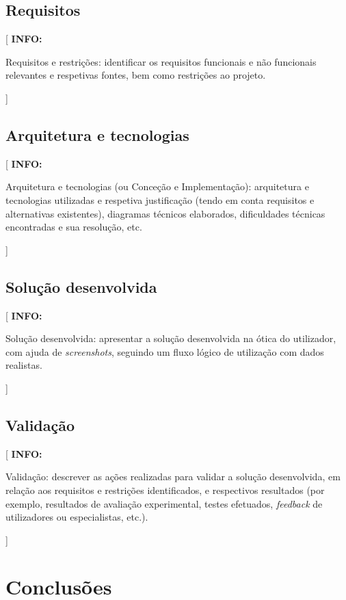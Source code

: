 \documentclass[11pt,a4paper]{report}
\newenvironment{info}[1]{\vspace*{6mm}\color{blue}[ \textbf{INFO:} \begin{em} #1}{\vspace*{3mm}\end{em} ]}
\begin{document}
\section{Requisitos}

\begin{info}
Requisitos e restrições: identificar os requisitos funcionais e não
funcionais relevantes e respetivas fontes, bem como restrições ao projeto. 
\end{info}

\section{Arquitetura e tecnologias}

\begin{info}
Arquitetura e tecnologias (ou Conceção e Implementação): arquitetura e
tecnologias utilizadas e respetiva justificação (tendo em conta
requisitos e alternativas existentes), diagramas técnicos elaborados,
dificuldades técnicas encontradas e sua resolução, etc. 
\end{info}

\section{Solução desenvolvida}

\begin{info}
Solução desenvolvida: apresentar a solução desenvolvida na ótica do
utilizador, com ajuda de \emph{screenshots}, seguindo um fluxo lógico
de utilização com dados realistas.
\end{info}

\section{Validação}

\begin{info}
Validação: descrever as ações realizadas para validar a solução
desenvolvida, em relação aos requisitos e restrições identificados, e 
respectivos resultados (por exemplo, resultados de avaliação
experimental, testes efetuados, \emph{feedback} de utilizadores ou
especialistas, etc.). 
\end{info}


\chapter{Conclusões}
\end{document}
